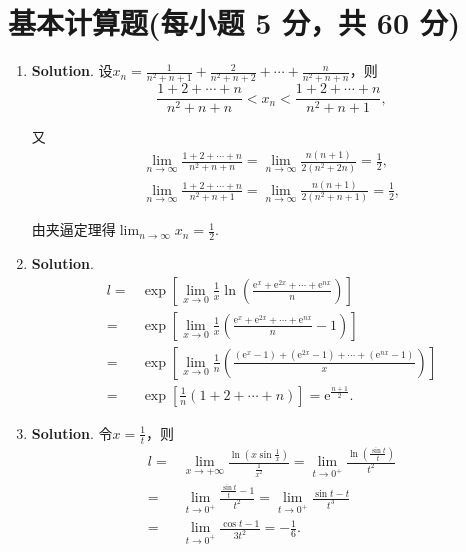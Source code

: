 \documentclass[../main.tex]{subfiles}
\begin{document}
\section{基本计算题(每小题 5 分，共 60 分)}
\begin{enumerate}
    \item \textbf{Solution}. 设$x_{n}=\frac{1}{n^{2}+n+1}+\frac{2}{n^{2}+n+2}+\cdots
              +\frac{n}{n^{2}+n+n}$，则
          \[
              \frac{1+2+\cdots+n}{n^{2}+n+n}< x_{n} < \frac{1+2+\cdots+n}{n^{2}+n+1},
          \]

          又
          \[
              \begin{gathered}
                  \lim_{n\to\infty}\frac{1+2+\cdots+n}{n^{2}+n+n}=\lim_{n\to\infty}\frac{n(n+1)}{2(n^{2}+2n)}
                  =\frac{1}{2}, \\
                  \lim_{n\to\infty}\frac{1+2+\cdots+n}{n^{2}+n+1}=\lim_{n\to\infty}\frac{n(n+1)}{2(n^{2}+n+1)}
                  =\frac{1}{2},
              \end{gathered}
          \]

          由夹逼定理得$\lim_{n\to\infty}x_{n}=\frac{1}{2}$.

    \item \textbf{Solution}.
          \[
              \begin{aligned}
                  l = {} & \exp\left[\lim_{x\to0}\frac{1}{x}\ln\left(\frac{\mathrm{e}^x+\mathrm{e}^{2x}+\cdots+\mathrm{e}^{nx}}{n}\right)\right]                                           \\
                  = {}   & \exp\left[\lim_{x\to0}\frac{1}{x}\left(\frac{\mathrm{e}^x+\mathrm{e}^{2x}+\cdots+\mathrm{e}^{nx}}{n}-1\right)\right]                                            \\
                  = {}   & \exp\left[\lim_{x\to0}\frac{1}{n}\left(\frac{\left(\mathrm{e}^x-1\right)+\left(\mathrm{e}^{2x}-1\right)+\cdots+\left(\mathrm{e}^{nx}-1\right)}{x}\right)\right] \\
                  = {}   & \exp\left[\frac{1}{n}(1+2+\cdots+n)\right]=\mathrm{e}^{\frac{n+1}{2}}.
              \end{aligned}
          \]

    \item \textbf{Solution}. 令$x=\frac{1}{t}$，则
          \[
              \begin{aligned}
                  l= {} & \lim_{x\to+\infty}\frac{\ln\left(x\sin\frac{1}{x}\right)}{\frac{1}{x^2}}= \lim_{t\to0^+}\frac{\ln\left(\frac{\sin t}{t}\right)}{t^2} \\
                  = {}  & \lim_{t\to0^+}\frac{\frac{\sin t}{t}-1}{t^2}=\lim_{t\to0^+}\frac{\sin t-t}{t^3}                                                      \\
                  = {}  & \lim_{t\to0^+}\frac{\cos t-1}{3t^2}=-\frac{1}{6}.
              \end{aligned}
          \]


\end{enumerate}
\end{document}
